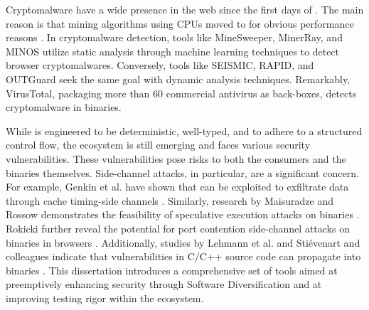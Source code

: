  Cryptomalware have a wide presence in the web since the first days of \wasm.
The main reason is that mining algorithms using CPUs moved to \wasm for obvious performance reasons \cite{musch2019new}. 
In cryptomalware detection, tools like MineSweeper\cite{Minesweeper}, MinerRay\cite{MinerRay}, and MINOS\cite{MINOS} utilize static analysis through machine learning techniques to detect browser cryptomalwares. 
Conversely, tools like SEISMIC\cite{SEISMIC}, RAPID\cite{RAPID}, and OUTGuard\cite{outguard} seek the same goal with dynamic analysis techniques.
Remarkably, VirusTotal, packaging more than 60 commercial antivirus as back-boxes, detects cryptomalware in \wasm binaries.




While \Wasm is engineered to be deterministic, well-typed, and to adhere to a structured control flow, the ecosystem is still emerging and faces various security vulnerabilities. 
These vulnerabilities pose risks to both the consumers and the \Wasm binaries themselves. 
Side-channel attacks, in particular, are a significant concern. 
For example, Genkin et al. have shown that \Wasm can be exploited to exfiltrate data through cache timing-side channels \cite{Genkin2018DrivebyKC}. 
Similarly, research by Maisuradze and Rossow demonstrates the feasibility of speculative execution attacks on \Wasm binaries \cite{ret2spec}. 
Rokicki \etal further reveal the potential for port contention side-channel attacks on \Wasm binaries in browsers \cite{10.1145/3488932.3517411}.
Additionally, studies by Lehmann et al. and Stiévenart and colleagues indicate that vulnerabilities in C/C++ source code can propagate into \Wasm binaries \cite{usenixWasm2020, DeRoover2022}. 
This dissertation introduces a comprehensive set of tools aimed at preemptively enhancing \Wasm security through Software Diversification and at improving testing rigor within the ecosystem.

